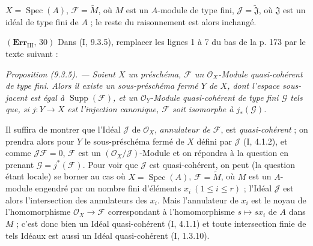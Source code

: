 $X=\operatorname{Spec}(A)$, $\mathscr F=\widetilde M$, où $M$ est un $A$-module
de type fini, $\mathscr J=\widetilde{\mathfrak J}$, où $\mathfrak J$ est un
idéal de type fini de $A$ ; le reste du raisonnement est alors inchangé.

\noindent\textbf{$(\mathbf{Err}_{\mathrm{III}},\,30)$} Dans (I, 9.3.5),
remplacer les lignes 1 à 7 du bas de la p. 173 par le texte suivant :

\emph{Proposition (9.3.5). --- Soient $X$ un préschéma, $\mathscr F$ un
$\mathscr O_X$-Module quasi-cohérent de type fini. Alors il existe un
sous-préschéma fermé $Y$ de $X$, dont l'espace sous-jacent est égal à
$\operatorname{Supp}(\mathscr F)$, et un $\mathscr O_Y$-Module quasi-cohérent de
type fini $\mathscr G$ tels que, si $j:Y\to X$ est l'injection canonique,
$\mathscr F$ soit isomorphe à $j_*(\mathscr G)$.}

Il suffira de montrer que l'Idéal $\mathscr J$ de $\mathscr O_X$,
\emph{annulateur de $\mathscr F$}, est \emph{quasi-cohérent} ; on prendra alors
pour $Y$ le sous-préschéma fermé de $X$ défini par $\mathscr J$ (I, 4.1.2), et
comme $\mathscr J\mathscr F=0$, $\mathscr F$ est un
$(\mathscr O_X/\mathscr J)$-Module et on répondra à la question en prenant
$\mathscr G=j^*(\mathscr F)$. Pour voir que $\mathscr J$ est quasi-cohérent, on
peut (la question étant locale) se borner au cas où
$X=\operatorname{Spec}(A)$, $\mathscr F=\widetilde M$, où $M$ est un $A$-module
engendré par un nombre fini d'éléments $x_i\ (1\leq i\leq r)$ ; l'Idéal
$\mathscr J$ est alors l'intersection des annulateurs des $x_i$. Mais
l'annulateur de $x_i$ est le noyau de l'homomorphisme
$\mathscr O_X\to\mathscr F$ correspondant à l'homomorphisme $s\mapsto sx_i$ de
$A$ dans $M$ ; c'est donc bien un Idéal quasi-cohérent (I, 4.1.1) et toute
intersection finie de tels Idéaux est aussi un Idéal quasi-cohérent (I,
1.3.10).
